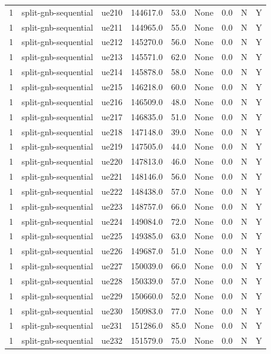\begin{table}[ht]
\begin{tabular}{|c|c|c|c|c|c|c|c|c|}
1 & split-gnb-sequential & ue210 & 144617.0 & 53.0 & None & 0.0 & N & Y \\
1 & split-gnb-sequential & ue211 & 144965.0 & 55.0 & None & 0.0 & N & Y \\
1 & split-gnb-sequential & ue212 & 145270.0 & 56.0 & None & 0.0 & N & Y \\
1 & split-gnb-sequential & ue213 & 145571.0 & 62.0 & None & 0.0 & N & Y \\
1 & split-gnb-sequential & ue214 & 145878.0 & 58.0 & None & 0.0 & N & Y \\
1 & split-gnb-sequential & ue215 & 146218.0 & 60.0 & None & 0.0 & N & Y \\
1 & split-gnb-sequential & ue216 & 146509.0 & 48.0 & None & 0.0 & N & Y \\
1 & split-gnb-sequential & ue217 & 146835.0 & 51.0 & None & 0.0 & N & Y \\
1 & split-gnb-sequential & ue218 & 147148.0 & 39.0 & None & 0.0 & N & Y \\
1 & split-gnb-sequential & ue219 & 147505.0 & 44.0 & None & 0.0 & N & Y \\
1 & split-gnb-sequential & ue220 & 147813.0 & 46.0 & None & 0.0 & N & Y \\
1 & split-gnb-sequential & ue221 & 148146.0 & 56.0 & None & 0.0 & N & Y \\
1 & split-gnb-sequential & ue222 & 148438.0 & 57.0 & None & 0.0 & N & Y \\
1 & split-gnb-sequential & ue223 & 148757.0 & 66.0 & None & 0.0 & N & Y \\
1 & split-gnb-sequential & ue224 & 149084.0 & 72.0 & None & 0.0 & N & Y \\
1 & split-gnb-sequential & ue225 & 149385.0 & 63.0 & None & 0.0 & N & Y \\
1 & split-gnb-sequential & ue226 & 149687.0 & 51.0 & None & 0.0 & N & Y \\
1 & split-gnb-sequential & ue227 & 150039.0 & 66.0 & None & 0.0 & N & Y \\
1 & split-gnb-sequential & ue228 & 150339.0 & 57.0 & None & 0.0 & N & Y \\
1 & split-gnb-sequential & ue229 & 150660.0 & 52.0 & None & 0.0 & N & Y \\
1 & split-gnb-sequential & ue230 & 150983.0 & 77.0 & None & 0.0 & N & Y \\
1 & split-gnb-sequential & ue231 & 151286.0 & 85.0 & None & 0.0 & N & Y \\
1 & split-gnb-sequential & ue232 & 151579.0 & 75.0 & None & 0.0 & N & Y \\

\end{tabular}
\end{table}

